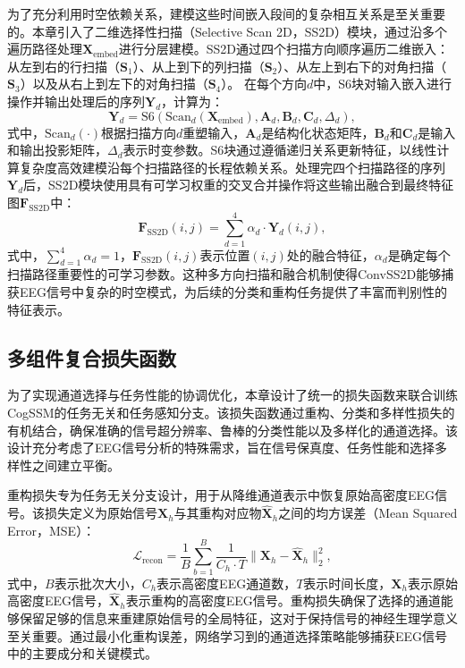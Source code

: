 为了充分利用时空依赖关系，建模这些时间嵌入段间的复杂相互关系是至关重要的。本章引入了二维选择性扫描（Selective Scan 2D，SS2D）模块\cite{liu2024vmamba}，通过沿多个遍历路径处理$\mathbf{X}_{\text{embed}}$进行分层建模。SS2D通过四个扫描方向顺序遍历二维嵌入：从左到右的行扫描（$\mathbf{S}_1$）、从上到下的列扫描（$\mathbf{S}_2$）、从左上到右下的对角扫描（$\mathbf{S}_3$）以及从右上到左下的对角扫描（$\mathbf{S}_4$）。
在每个方向$d$中，S6块对输入嵌入进行操作并输出处理后的序列$\mathbf{Y}_d$，计算为：
\begin{equation}
\mathbf{Y}_d = \text{S6}(\text{Scan}_d(\mathbf{X}_{\text{embed}}), \mathbf{A}_d, \mathbf{B}_d, \mathbf{C}_d, \Delta_d),
\end{equation}
式中，$\text{Scan}_d(\cdot)$根据扫描方向$d$重塑输入，$\mathbf{A}_d$是结构化状态矩阵，$\mathbf{B}_d$和$\mathbf{C}_d$是输入和输出投影矩阵，$\Delta_d$表示时变参数。S6块通过遵循递归关系更新特征，以线性计算复杂度高效建模沿每个扫描路径的长程依赖关系。处理完四个扫描路径的序列$\mathbf{Y}_d$后，SS2D模块使用具有可学习权重的交叉合并操作将这些输出融合到最终特征图$\mathbf{F}_\text{SS2D}$中：  
\begin{equation}
\mathbf{F}_\text{SS2D}(i,j) = \sum_{d=1}^4 \alpha_d \cdot \mathbf{Y}_d(i,j), 
\end{equation}
式中，$\sum_{d=1}^4 \alpha_d = 1$，$\mathbf{F}_\text{SS2D}(i,j)$表示位置$(i,j)$处的融合特征，$\alpha_d$是确定每个扫描路径重要性的可学习参数。这种多方向扫描和融合机制使得ConvSS2D能够捕获EEG信号中复杂的时空模式，为后续的分类和重构任务提供了丰富而判别性的特征表示。

\subsection{多组件复合损失函数}
为了实现通道选择与任务性能的协调优化，本章设计了统一的损失函数来联合训练CogSSM的任务无关和任务感知分支。该损失函数通过重构、分类和多样性损失的有机结合，确保准确的信号超分辨率、鲁棒的分类性能以及多样化的通道选择。该设计充分考虑了EEG信号分析的特殊需求，旨在信号保真度、任务性能和选择多样性之间建立平衡。

重构损失专为任务无关分支设计，用于从降维通道表示中恢复原始高密度EEG信号。该损失定义为原始信号$\mathbf{X}_{h}$与其重构对应物$\hat{\mathbf{X}}_{h}$之间的均方误差（Mean Squared Error，MSE）：
\begin{equation}
\mathcal{L}_{\text{recon}} = \frac{1}{B} \sum_{b=1}^{B} \frac{1}{C_h \cdot T} \|\mathbf{X}_{h} - \hat{\mathbf{X}}_{h}\|_2^2,
\end{equation}
式中，$B$表示批次大小，$C_h$表示高密度EEG通道数，$T$表示时间长度，$\mathbf{X}_{h}$表示原始高密度EEG信号，$\hat{\mathbf{X}}_{h}$表示重构的高密度EEG信号。重构损失确保了选择的通道能够保留足够的信息来重建原始信号的全局特征，这对于保持信号的神经生理学意义至关重要。通过最小化重构误差，网络学习到的通道选择策略能够捕获EEG信号中的主要成分和关键模式。

